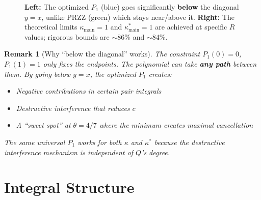 \documentclass[11pt]{article}
\newtheorem{remark}{Remark}
\begin{document}
\begin{figure}[h]
\caption{\textbf{Left:} The optimized $P_1$ (blue) goes significantly \textbf{below} the diagonal $y = x$, unlike PRZZ (green) which stays near/above it. \textbf{Right:} The theoretical limits $\kappa_{\text{main}} = 1$ and $\kappa^*_{\text{main}} = 1$ are achieved at specific $R$ values; rigorous bounds are $\sim$86\% and $\sim$84\%.}
\label{fig:breakthrough}
\end{figure}

\begin{remark}[Why ``below the diagonal'' works]
The constraint $P_1(0) = 0$, $P_1(1) = 1$ only fixes the endpoints. The polynomial can take \textbf{any path} between them. By going below $y = x$, the optimized $P_1$ creates:
\begin{itemize}
\item Negative contributions in certain pair integrals
\item Destructive interference that reduces $c$
\item A ``sweet spot'' at $\theta = 4/7$ where the minimum creates maximal cancellation
\end{itemize}
The same universal $P_1$ works for both $\kappa$ and $\kappa^*$ because the destructive interference mechanism is independent of $Q$'s degree.
\end{remark}


\part{Integral Structure}
\end{document}
